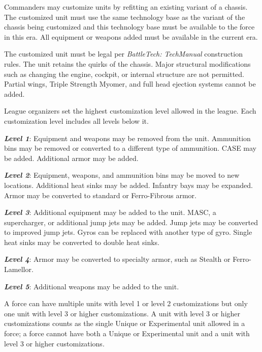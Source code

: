 Commanders may customize units by refitting an existing variant of a chassis.
The customized unit must use the same technology base as the variant of the chassis being customized and this technology base must be available to the force in this era.
All equipment or weapons added must be available in the current era.

The customized unit must be legal per \emph{BattleTech: TechManual} construction rules.
The unit retains the quirks of the chassis.
Major structural modifications such as changing the engine, cockpit, or internal structure are not permitted.
Partial wings, Triple Strength Myomer, and full head ejection systems cannot be added.

League organizers set the highest customization level allowed in the league.
Each customization level includes all levels below it.

\begin{description}

\item \emph{\bfseries Level 1}: Equipment and weapons may be removed from the unit.
Ammunition bins may be removed or converted to a different type of ammunition.
CASE may be added.
Additional armor may be added.

\item \emph{\bfseries Level 2}: Equipment, weapons, and ammunition bins may be moved to new locations.
Additional heat sinks may be added.
Infantry bays may be expanded.
Armor may be converted to standard or Ferro-Fibrous armor.

\item \emph{\bfseries Level 3}: Additional equipment may be added to the unit. 
MASC, a supercharger, or additional jump jets may be added.
Jump jets may be converted to improved jump jets.
Gyros can be replaced with another type of gyro.
Single heat sinks may be converted to double heat sinks.

\item \emph{\bfseries Level 4}: Armor may be converted to specialty armor, such as Stealth or Ferro-Lamellor.

\item \emph{\bfseries Level 5}: Additional weapons may be added to the unit.

\end{description}

A force can have multiple units with level 1 or level 2 customizations but only one unit with level 3 or higher customizations.
A unit with level 3 or higher customizations counts as the single Unique or Experimental unit allowed in a force; a force cannot have both a Unique or Experimental unit and a unit with level 3 or higher customizations.

